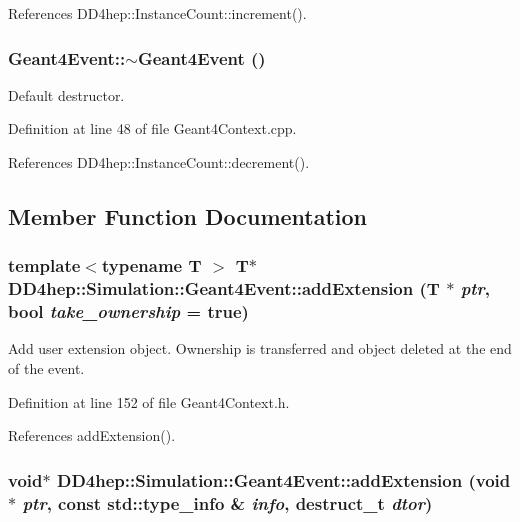 References DD4hep::InstanceCount::increment().\hypertarget{class_d_d4hep_1_1_simulation_1_1_geant4_event_ab98455cace8f9234b238e350c2299fd0}{
\subsubsection[{$\sim$Geant4Event}]{\setlength{\rightskip}{0pt plus 5cm}Geant4Event::$\sim$Geant4Event ()}}
\label{class_d_d4hep_1_1_simulation_1_1_geant4_event_ab98455cace8f9234b238e350c2299fd0}


Default destructor. 

Definition at line 48 of file Geant4Context.cpp.

References DD4hep::InstanceCount::decrement().

\subsection{Member Function Documentation}
\hypertarget{class_d_d4hep_1_1_simulation_1_1_geant4_event_af662da07fc86ccd6bc94fdb7b05faa26}{
\subsubsection[{addExtension}]{\setlength{\rightskip}{0pt plus 5cm}template$<$typename T $>$ {\bf T}$\ast$ DD4hep::Simulation::Geant4Event::addExtension ({\bf T} $\ast$ {\em ptr}, \/  bool {\em take\_\-ownership} = {\ttfamily true})}}
\label{class_d_d4hep_1_1_simulation_1_1_geant4_event_af662da07fc86ccd6bc94fdb7b05faa26}


Add user extension object. Ownership is transferred and object deleted at the end of the event. 

Definition at line 152 of file Geant4Context.h.

References addExtension().\hypertarget{class_d_d4hep_1_1_simulation_1_1_geant4_event_aee3baf75d103ea5fbb2e59230392c5d1}{
\subsubsection[{addExtension}]{\setlength{\rightskip}{0pt plus 5cm}void$\ast$ DD4hep::Simulation::Geant4Event::addExtension (void $\ast$ {\em ptr}, \/  const std::type\_\-info \& {\em info}, \/  {\bf destruct\_\-t} {\em dtor})}}
\label{class_d_d4hep_1_1_simulation_1_1_geant4_event_aee3baf75d103ea5fbb2e59230392c5d1}


